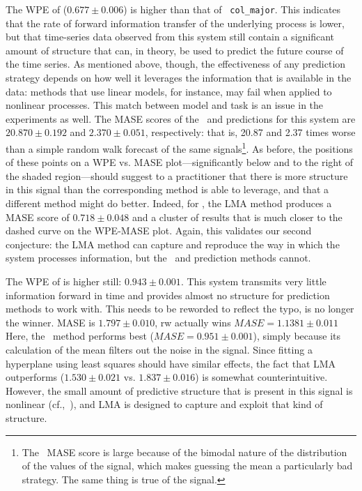 The WPE of \svdfive ($0.677 \pm 0.006$) is higher than that of {\tt
  col\_major}.  This indicates that the rate of forward information
transfer of the underlying process is lower, but that time-series data
observed from this system still contain a significant amount of
structure that can, in theory, be used to predict the future course of
the time series.  As mentioned above, though, the effectiveness of any
prediction strategy depends on how well it leverages the information
that is available in the data: methods that use linear models, for
instance, may fail when applied to nonlinear processes.
%
%
This match between model and task is an issue in the \svdfive
experiments as well.  The MASE scores of the \naive ~and \arima
predictions for this system are $20.870 \pm 0.192$ and $2.370 \pm
0.051$, respectively: that is, 20.87 and 2.37 times worse than a
simple random walk forecast of the same signals\footnote{The \naive
  ~MASE score is large because of the bimodal nature of the
  distribution of the values of the signal, which makes guessing the
  mean a particularly bad strategy.  The same thing is true of the
  \svdthree signal.}.  As before, the positions of these points on a
WPE vs. MASE plot---significantly below and to the right of the shaded
region---should suggest to a practitioner that there is more structure
in this signal than the corresponding method is able to leverage, and
that a different method might do better.  Indeed, for \svdfive, the
LMA method produces a MASE score of $ 0.718\pm 0.048 $ and a cluster
of results that is much closer to the dashed curve on the WPE-MASE
plot.  Again, this validates our second conjecture: the LMA method can
capture and reproduce the way in which the \svdfive system processes
information, but the \naive ~and \arima prediction methods cannot.

The WPE of \gcc is higher still: $0.943 \pm 0.001$.  This system
transmits very little information forward in time and provides almost
no structure for prediction methods to work with.  \alert{This needs to be reworded to reflect the typo, \naive is no longer the winner. MASE is $1.797 \pm 0.010$, rw actually wins $MASE = 1.1381 \pm 0.011$  Here, the \naive
~method performs best ($MASE=0.951 \pm 0.001$), simply because its
calculation of the mean filters out the noise in the signal.  Since
fitting a hyperplane using least squares should have similar effects,
the fact that LMA outperforms \arima ($1.530 \pm 0.021$ vs. $1.837
\pm 0.016$) is somewhat counterintuitive.  However, the small amount
of predictive structure that is present in this signal is nonlinear
(cf.,~\cite{mytkowicz09}), and LMA is designed to capture and exploit
that kind of structure.}

